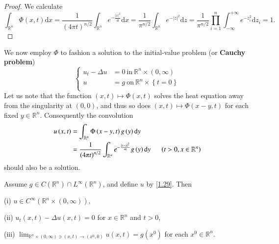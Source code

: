 \begin{proof}
We calculate 
$$
\int_{\mathbb{R} ^n}{\Phi \left( x,t \right) \mathrm{d}x}=\frac{1}{\left( 4\pi t \right) ^{n/2}}\int_{\mathbb{R} ^n}{e^{-\frac{\left| x \right|^2}{4t}}\mathrm{d}x}=\frac{1}{\pi ^{n/2}}\int_{\mathbb{R} ^n}{e^{-\left| z \right|^2}\mathrm{d}z}=\frac{1}{\pi ^{n/2}}\prod_{i=1}^n{\int_{-\infty}^{+\infty}{e^{-z_{i}^{2}}\mathrm{d}z_i}}=1.
$$
\end{proof}
We now employ $\Phi$ to fashion a solution to the initial-value problem (or \textbf{Cauchy problem}) 
\begin{equation}\label{1.28}
\left\{ \begin{aligned}
	u_t-\Delta u&=0\ \text{in}\ \mathbb{R} ^n\times \left( 0,\infty \right)\\
	u&=g\ \text{on}\ \mathbb{R} ^n\times \left\{ t=0 \right\}\\
\end{aligned} \right. 
\end{equation}
Let us note that the function $(x,t)\mapsto\Phi(x,t)$ solves the heat equation away from the singularity at $(0,0)$, and thus so does $(x,t)\mapsto\Phi(x-y,t)$ for each fixed $y\in\mathbb{R}^n$. Consequently the convolution 
\begin{equation}\label{1.29}
\begin{aligned}
u\left( x,t \right) &=\int_{\mathbb{R} ^n}{\Phi \left( x-y,t \right) g\left( y \right) \mathrm{d}y}
\\
&=\frac{1}{\left( 4\pi t \right) ^{n/2}}\int_{\mathbb{R} ^n}{e^{-\frac{\left| x-y \right|^2}{4t}}g\left( y \right) \mathrm{d}y}\hspace{0.5cm}\left( t>0,x\in \mathbb{R} ^n \right) 
\end{aligned}
\end{equation}
should also be a solution.
\begin{theorem}\label{Thm1.3.2}
Assume $g\in C(\mathbb{R}^n)\cap L^\infty(\mathbb{R}^n)$, and define $u$ by \eqref{1.29}. Then \par
(i) $u\in C^\infty(\mathbb{R}^n\times(0,\infty))$,\par
(ii) $u_t(x,t)-\Delta u(x,t)=0$ for $x\in\mathbb{R}^n$ and $t>0$, \par
(iii) $\lim_{\mathbb{R}^n\times(0,\infty)\ni(x,t)\to(x^0,0)}u(x,t)=g(x^0)$ for each $x^0\in\mathbb{R}^n$.
\end{theorem}
